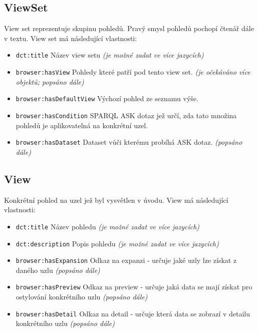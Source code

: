 \subsection{ViewSet} \label{pozadavky-view-sets}
View set reprezentuje skupinu pohledů. Pravý smysl pohledů pochopí čtenář dále v textu. View set má následující vlastnosti:
\begin{itemize}
    \item \texttt{dct:title} Název view setu \textit{(je možné zadat ve více jazycích)}
    \item \texttt{browser:hasView} Pohledy které patří pod tento view set. \textit{(je očekáváno více objektů; popsáno dále)}
    \item \texttt{browser:hasDefaultView} Výchozí pohled ze seznamu výše.
    \item \texttt{browser:hasCondition} SPARQL ASK dotaz jež určí, zda tato množina pohledů je aplikovatelná na konkrétní uzel.
    \item \texttt{browser:hasDataset} Dataset vůči kterému probíhá ASK dotaz. \textit{(popsáno dále)}
\end{itemize}

\subsection{View}
Konkrétní pohled na uzel jež byl vysvětlen v úvodu. View má následující vlastnosti:

\begin{itemize}
    \item \texttt{dct:title} Název pohledu \textit{(je možné zadat ve více jazycích)}
    \item \texttt{dct:description} Popis pohledu \textit{(je možné zadat ve více jazycích)}
    \item \texttt{browser:hasExpansion} Odkaz na expanzi - určuje jaké uzly lze získat z daného uzlu \textit{(popsáno dále)}
    \item \texttt{browser:hasPreview} Odkaz na preview - určuje jaká data se mají získat pro ostylování konkrétního uzlu \textit{(popsáno dále)}
    \item \texttt{browser:hasDetail} Odkaz na detail - určuje která data se zobrazí v detailu konkrétního uzlu \textit{(popsáno dále)}
\end{itemize}

